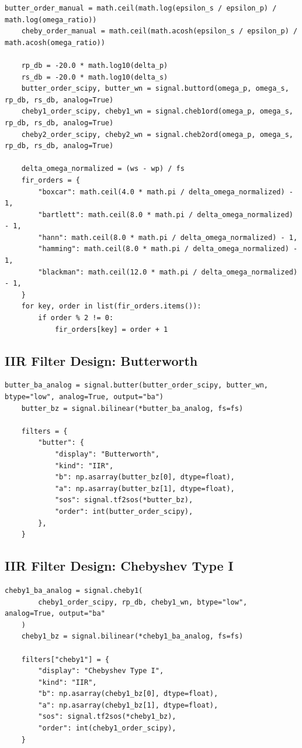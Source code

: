 \documentclass[12pt, a4paper]{article}
\begin{document}
\begin{lstlisting}[caption={Imports, helper functions, and parameter computation for Lab 02.}, label={lst:lab02_params}]
    butter_order_manual = math.ceil(math.log(epsilon_s / epsilon_p) / math.log(omega_ratio))
    cheby_order_manual = math.ceil(math.acosh(epsilon_s / epsilon_p) / math.acosh(omega_ratio))

    rp_db = -20.0 * math.log10(delta_p)
    rs_db = -20.0 * math.log10(delta_s)
    butter_order_scipy, butter_wn = signal.buttord(omega_p, omega_s, rp_db, rs_db, analog=True)
    cheby1_order_scipy, cheby1_wn = signal.cheb1ord(omega_p, omega_s, rp_db, rs_db, analog=True)
    cheby2_order_scipy, cheby2_wn = signal.cheb2ord(omega_p, omega_s, rp_db, rs_db, analog=True)

    delta_omega_normalized = (ws - wp) / fs
    fir_orders = {
        "boxcar": math.ceil(4.0 * math.pi / delta_omega_normalized) - 1,
        "bartlett": math.ceil(8.0 * math.pi / delta_omega_normalized) - 1,
        "hann": math.ceil(8.0 * math.pi / delta_omega_normalized) - 1,
        "hamming": math.ceil(8.0 * math.pi / delta_omega_normalized) - 1,
        "blackman": math.ceil(12.0 * math.pi / delta_omega_normalized) - 1,
    }
    for key, order in list(fir_orders.items()):
        if order % 2 != 0:
            fir_orders[key] = order + 1
\end{lstlisting}

\subsection{IIR Filter Design: Butterworth}
\begin{lstlisting}[caption={Butterworth analog prototype design and bilinear-transform conversion.}, label={lst:lab02_butter}]
    butter_ba_analog = signal.butter(butter_order_scipy, butter_wn, btype="low", analog=True, output="ba")
    butter_bz = signal.bilinear(*butter_ba_analog, fs=fs)

    filters = {
        "butter": {
            "display": "Butterworth",
            "kind": "IIR",
            "b": np.asarray(butter_bz[0], dtype=float),
            "a": np.asarray(butter_bz[1], dtype=float),
            "sos": signal.tf2sos(*butter_bz),
            "order": int(butter_order_scipy),
        },
    }
\end{lstlisting}

\subsection{IIR Filter Design: Chebyshev Type I}
\begin{lstlisting}[caption={Chebyshev Type I design code.}, label={lst:lab02_cheby1}]
    cheby1_ba_analog = signal.cheby1(
        cheby1_order_scipy, rp_db, cheby1_wn, btype="low", analog=True, output="ba"
    )
    cheby1_bz = signal.bilinear(*cheby1_ba_analog, fs=fs)

    filters["cheby1"] = {
        "display": "Chebyshev Type I",
        "kind": "IIR",
        "b": np.asarray(cheby1_bz[0], dtype=float),
        "a": np.asarray(cheby1_bz[1], dtype=float),
        "sos": signal.tf2sos(*cheby1_bz),
        "order": int(cheby1_order_scipy),
    }
\end{lstlisting}
\end{document}
